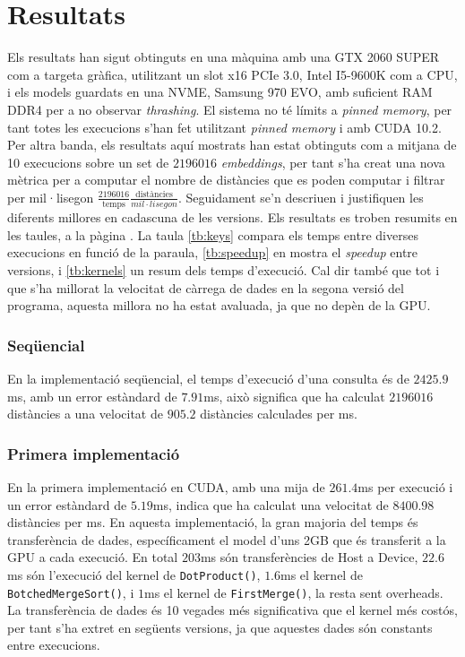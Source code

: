 \documentclass[catalan,10pt,a4paper]{article}
\begin{document}
\section*{Resultats}\label{sec:results}
Els resultats han sigut obtinguts en una màquina amb una GTX 2060 SUPER com a targeta gràfica, utilitzant un slot x16 PCIe 3.0, Intel I5-9600K com a CPU, i els models guardats en una NVME, Samsung 970 EVO, amb suficient RAM DDR4 per a no observar \textit{thrashing}. 
El sistema no té límits a \textit{pinned memory}, per tant totes les execucions s'han fet utilitzant \textit{pinned memory} i amb CUDA 10.2. Per altra banda, els resultats aquí mostrats han estat obtinguts com a mitjana de 10 execucions sobre un set de $2196016$ \textit{embeddings}, per tant s'ha creat una nova mètrica per a computar el nombre de distàncies que es poden computar i filtrar per mil·lisegon $\frac{2196016}{\text{temps}}\frac{\text{distàncies}}{mil·lisegon}$.
Seguidament se'n descriuen i justifiquen les diferents millores en cadascuna de les versions. Els resultats es troben resumits en les taules, a la pàgina \pageref{tb:keys}. La taula \ref{tb:keys} compara els temps entre diverses execucions en funció de la paraula, \ref{tb:speedup} en mostra el \textit{speedup} entre versions, i \ref{tb:kernels} un resum dels temps d'execució.
Cal dir també que tot i que s'ha millorat la velocitat de càrrega de dades en la segona versió del programa, aquesta millora no ha estat avaluada, ja que no depèn de la GPU.
\subsubsection*{Seqüencial}
En la implementació seqüencial, el temps d'execució d'una consulta és de $2425.9$ms, amb un error estàndard de $7.91$ms, això significa que ha calculat $2196016$ distàncies a una velocitat de $905.2$ distàncies calculades per ms. 
\subsubsection*{Primera implementació}
En la primera implementació en CUDA, amb una mija de $261.4$ms per execució i un error estàndard de $5.19$ms, indica que ha calculat una velocitat de $8400.98$ distàncies per ms. En aquesta implementació, la gran majoria del temps és transferència de dades, específicament el model d'uns 2GB que és transferit a la GPU a cada execució. En total $203$ms són transferències de Host a Device, $22.6$ms són l'execució del kernel de \verb|DotProduct()|, $1.6$ms el kernel de \verb|BotchedMergeSort()|, i $1$ms el kernel de \verb|FirstMerge()|, la resta sent overheads.
La transferència de dades és 10 vegades més significativa que el kernel més costós, per tant s'ha extret en següents versions, ja que aquestes dades són constants entre execucions.
\end{document}
